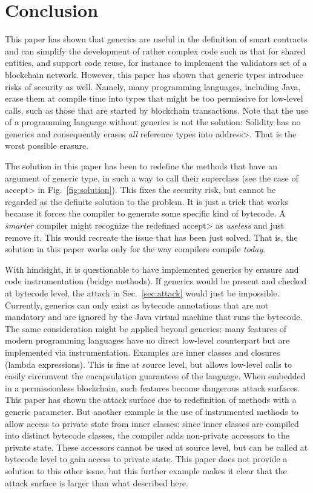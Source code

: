 \section{Conclusion}\label{sec:conclusion} 

This paper has shown that generics are useful in the definition
of smart contracts and can simplify the development of rather complex
code such as that for shared entities, and support code reuse, for
instance to implement the validators set of a blockchain network.
However, this paper has shown that generic types
introduce risks of security as well.
Namely, many
programming languages, including Java, erase them at compile time
into types that might be too permissive for low-level calls, such as
those that are started by blockchain transactions. Note that the use of a programming
language without generics is not the solution: Solidity has no generics
and consequently erases \emph{all} reference types into \<address>.
That is the worst possible erasure.

The solution in this paper has been to redefine the methods that have an argument
of generic type, in such a way to call their superclass
(see the case of \<accept> in Fig.~\ref{fig:solution}). This fixes the security risk,
but cannot be regarded as the definite solution to the problem. It is just a trick that
works because it forces the compiler to generate some specific kind of bytecode.
A \emph{smarter} compiler might recognize the redefined \<accept> as
\emph{useless} and just remove it. This would recreate the issue that
has been just solved. That is, the solution in this paper works only for the way
compilers compile \emph{today}.

With hindsight, it is questionable to have implemented generics by erasure
and code instrumentation (bridge methods). If generics would be present
and checked at bytecode level, the attack in Sec.~\ref{sec:attack} would just
be impossible. Currently, generics can only exist as bytecode annotations
that are not mandatory and are ignored by the Java virtual machine
that runs the bytecode. The same consideration might be applied beyond
generics: many features of modern programming
languages have no direct low-level
counterpart but are implemented via instrumentation. Examples are
inner classes and closures (lambda expressions). This is fine at source level, but allows
low-level calls to easily circumvent
the encapsulation guarantees of the language. When embedded in a permissionless
blockchain, such features become dangerous attack surfaces. This paper has shown
the attack surface due to redefinition of methods with a generic parameter.
But another example is the use of instrumented methods to allow access to
private state from inner classes: since inner classes are compiled into distinct
bytecode classes, the compiler adds non-private accessors to the
private state. These accessors cannot be used
at source level, but can be called at bytecode level to gain access to private state.
This paper does not provide a solution to this other issue, but this further example
makes it clear that the attack surface is larger than what described here.
